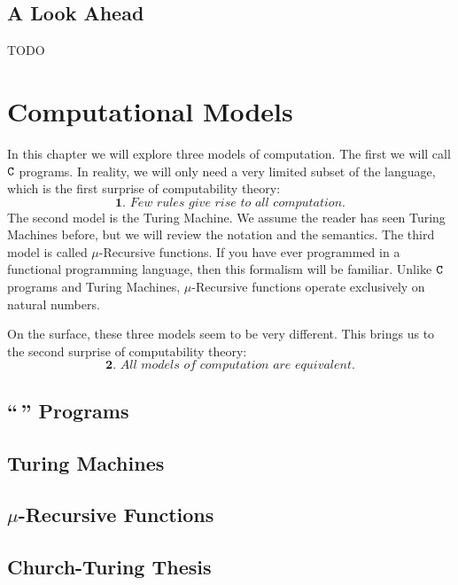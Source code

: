 \documentclass[english, 12pt]{article}
\begin{document}
  \subsection{A Look Ahead}
  TODO

  \section{Computational Models}
  In this chapter we will explore three models of computation. The first
  we will call ${\texttt{C}}$ programs. In reality, we will only need a very 
  limited subset of the language, which is the first surprise of computability
  theory:
  \[ \textbf{1. }\textit{Few rules give rise to all computation.} \]
  The second model is the Turing Machine. We assume the reader has seen
  Turing Machines before, but we will review the notation and the semantics.
  The third model is called $\mu$-Recursive functions. If you have ever
  programmed in a functional programming language, then this formalism will
  be familiar. Unlike ${\texttt{C}}$ programs and Turing Machines, $\mu$-Recursive
  functions operate exclusively on natural numbers. \n

  On the surface, these three models seem to be very different. This brings
  us to the second surprise of computability theory:
  \[ \textbf{2. } \textit{All models of computation are equivalent.} \]
  \subsection{``\pC\,'' Programs}
  \subsection{Turing Machines}
  \subsection{$\mu$-Recursive Functions}
  \subsection{Church-Turing Thesis}
  
\end{document}
